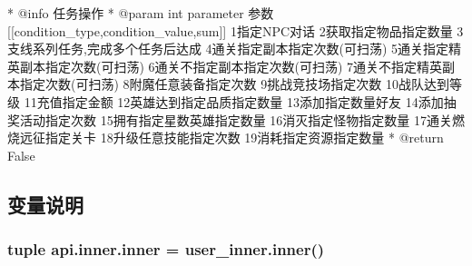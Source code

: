 \begin{DoxyVerb}* @info 任务操作
* @param int parameter  参数[[condition_type,condition_value,sum]]
1指定NPC对话 
2获取指定物品指定数量 
3支线系列任务,完成多个任务后达成 
4通关指定副本指定次数(可扫荡) 
5通关指定精英副本指定次数(可扫荡) 
6通关不指定副本指定次数(可扫荡) 
7通关不指定精英副本指定次数(可扫荡) 
8附魔任意装备指定次数 
9挑战竞技场指定次数 
10战队达到等级 
11充值指定金额 
12英雄达到指定品质指定数量 
13添加指定数量好友 
14添加抽奖活动指定次数 
15拥有指定星数英雄指定数量 
16消灭指定怪物指定数量 
17通关燃烧远征指定关卡 
18升级任意技能指定次数 
19消耗指定资源指定数量
* @return False
\end{DoxyVerb}
 

\subsection{变量说明}
\hypertarget{namespaceapi_1_1inner_a0526a93478a6286d3597c77c7e5cd710}{
\subsubsection[{inner}]{\setlength{\rightskip}{0pt plus 5cm}tuple api.\-inner.\-inner = user\-\_\-inner.\-inner()}}\label{namespaceapi_1_1inner_a0526a93478a6286d3597c77c7e5cd710}
